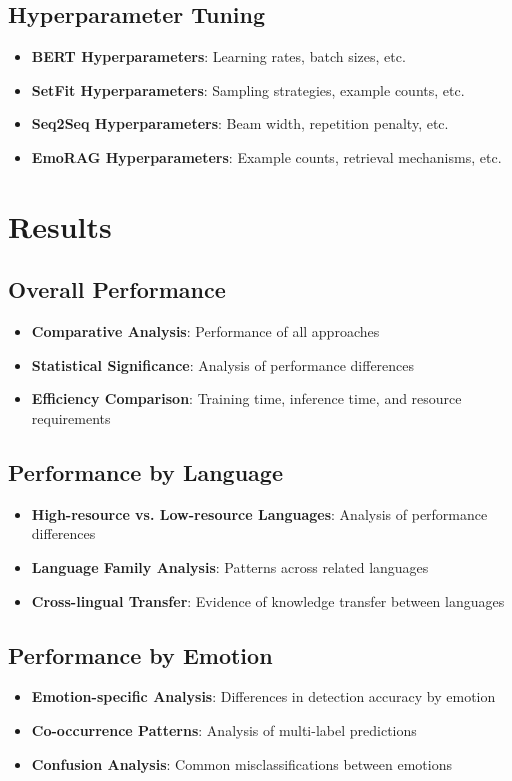\documentclass[a4paper,12pt]{extarticle}
\begin{document}
\subsection{Hyperparameter Tuning}
\begin{itemize}
\item \textbf{BERT Hyperparameters}: Learning rates, batch sizes, etc.
\item \textbf{SetFit Hyperparameters}: Sampling strategies, example counts, etc.
\item \textbf{Seq2Seq Hyperparameters}: Beam width, repetition penalty, etc.
\item \textbf{EmoRAG Hyperparameters}: Example counts, retrieval mechanisms, etc.
\end{itemize}

\section{Results}

\subsection{Overall Performance}
\begin{itemize}
\item \textbf{Comparative Analysis}: Performance of all approaches
\item \textbf{Statistical Significance}: Analysis of performance differences
\item \textbf{Efficiency Comparison}: Training time, inference time, and resource requirements
\end{itemize}

\subsection{Performance by Language}
\begin{itemize}
\item \textbf{High-resource vs. Low-resource Languages}: Analysis of performance differences
\item \textbf{Language Family Analysis}: Patterns across related languages
\item \textbf{Cross-lingual Transfer}: Evidence of knowledge transfer between languages
\end{itemize}

\subsection{Performance by Emotion}
\begin{itemize}
\item \textbf{Emotion-specific Analysis}: Differences in detection accuracy by emotion
\item \textbf{Co-occurrence Patterns}: Analysis of multi-label predictions
\item \textbf{Confusion Analysis}: Common misclassifications between emotions
\end{itemize}
\end{document}
